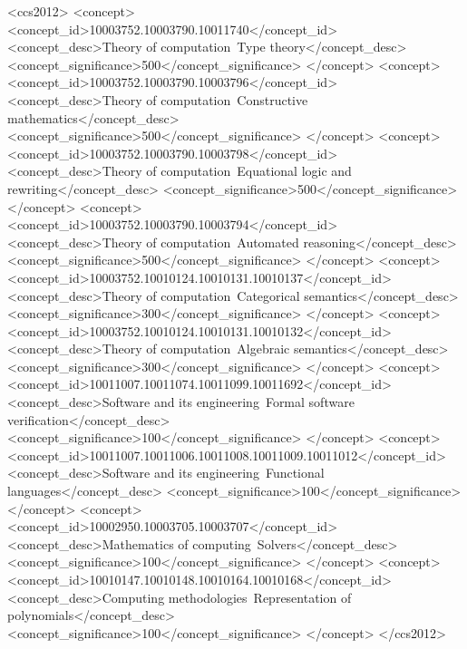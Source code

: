 \begin{CCSXML}
<ccs2012>
   <concept>
       <concept_id>10003752.10003790.10011740</concept_id>
       <concept_desc>Theory of computation~Type theory</concept_desc>
       <concept_significance>500</concept_significance>
       </concept>
   <concept>
       <concept_id>10003752.10003790.10003796</concept_id>
       <concept_desc>Theory of computation~Constructive mathematics</concept_desc>
       <concept_significance>500</concept_significance>
       </concept>
   <concept>
       <concept_id>10003752.10003790.10003798</concept_id>
       <concept_desc>Theory of computation~Equational logic and rewriting</concept_desc>
       <concept_significance>500</concept_significance>
       </concept>
   <concept>
       <concept_id>10003752.10003790.10003794</concept_id>
       <concept_desc>Theory of computation~Automated reasoning</concept_desc>
       <concept_significance>500</concept_significance>
       </concept>
   <concept>
       <concept_id>10003752.10010124.10010131.10010137</concept_id>
       <concept_desc>Theory of computation~Categorical semantics</concept_desc>
       <concept_significance>300</concept_significance>
       </concept>
   <concept>
       <concept_id>10003752.10010124.10010131.10010132</concept_id>
       <concept_desc>Theory of computation~Algebraic semantics</concept_desc>
       <concept_significance>300</concept_significance>
       </concept>
   <concept>
       <concept_id>10011007.10011074.10011099.10011692</concept_id>
       <concept_desc>Software and its engineering~Formal software verification</concept_desc>
       <concept_significance>100</concept_significance>
       </concept>
   <concept>
       <concept_id>10011007.10011006.10011008.10011009.10011012</concept_id>
       <concept_desc>Software and its engineering~Functional languages</concept_desc>
       <concept_significance>100</concept_significance>
       </concept>
   <concept>
       <concept_id>10002950.10003705.10003707</concept_id>
       <concept_desc>Mathematics of computing~Solvers</concept_desc>
       <concept_significance>100</concept_significance>
       </concept>
   <concept>
       <concept_id>10010147.10010148.10010164.10010168</concept_id>
       <concept_desc>Computing methodologies~Representation of polynomials</concept_desc>
       <concept_significance>100</concept_significance>
       </concept>
 </ccs2012>
\end{CCSXML}

